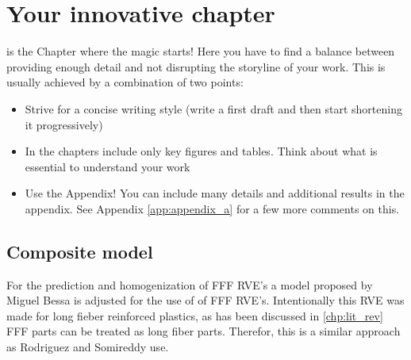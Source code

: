 \chapter{Your innovative chapter}
\label{chp:innovative_chapter}

\graphicspath{{chapter_3/figures/}} %

 is the Chapter where the magic starts! Here you have to find a balance between providing enough detail and not disrupting the storyline of your work. This is usually achieved by a combination of two points:

\begin{itemize}
	\item Strive for a concise writing style (write a first draft and then start shortening it progressively)
	\item In the chapters include only key figures and tables. Think about what is essential to understand your work
	\item Use the Appendix! You can include many details and additional results in the appendix. See Appendix \ref{app:appendix_a} for a few more comments on this.
\end{itemize}

\section{Composite model}
For the prediction and homogenization of FFF RVE's a model proposed by Miguel Bessa \cite{bessa2017a} is adjusted for the use of of FFF RVE's. Intentionally this RVE was made for long fieber reinforced plastics, as has been discussed in \ref{chp:lit_rev} FFF parts can be treated as long fiber parts. Therefor, this is a similar approach as Rodriguez \cite{Rodriguez2003MechanicalModeling} and Somireddy \cite{Somireddy2018DevelopmentFDM} use. 